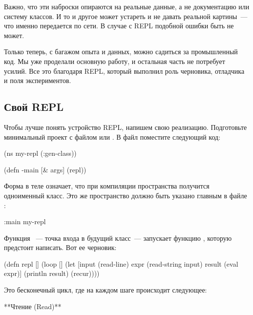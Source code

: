 Важно, что эти наброски опираются на реальные данные, а не документацию или систему классов. И то и другое может устареть и не давать реальной картины~--- что именно передается по сети. В случае с REPL подобной ошибки быть не может.

Только теперь, с багажом опыта и данных, можно садиться за промышленный код. Мы уже проделали основную работу, и остальная часть не потребует усилий. Все это благодаря REPL, который выполнил роль черновика, отладчика и поля экспериментов.

\subsection{Свой REPL}

Чтобы лучше понять устройство REPL, напишем свою реализацию. Подготовьте минимальный проект с файлом  или . В файл  поместите следующий код:

\begin{english}
  \begin{clojure}
(ns my-repl
  (:gen-class))

(defn -main [& args]
  (repl))
  \end{clojure}
\end{english}

Форма  в теле  означает, что при компиляции пространства получится одноименный класс. Это же пространство должно быть указано главным в файле :

\begin{english}
  \begin{clojure}
:main my-repl
  \end{clojure}
\end{english}

Функция ~--- точка входа в будущий класс~--- запускает функцию , которую предстоит написать. Вот ее черновик:

\begin{english}
  \begin{clojure}
(defn repl []
  (loop []
    (let [input (read-line)
          expr (read-string input)
          result (eval expr)]
      (println result)
      (recur))))
  \end{clojure}
\end{english}

Это бесконечный цикл, где на каждом шаге происходит следующее:

**Чтение (Read)**

